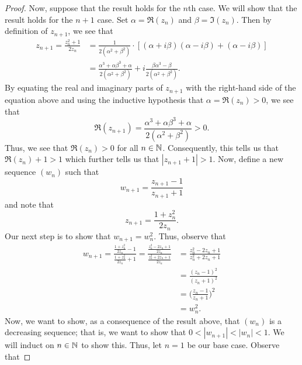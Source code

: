 \documentclass[a4paper]{article}
\begin{document}
\begin{enumerate}
\begin{proof}
        Now, suppose that the result holds for the \( n \)th case. We will show that the result holds for the \( n + 1  \) case. Set \( \alpha = \Re({z}_{n})  \) and \( \beta = \Im({z}_{n}) \). Then by definition of \( {z}_{n+1} \), we see that
        \begin{align*}
            {z}_{n+1} = \frac{ {z}_{n}^{2} + 1 }{ 2 {z}_{n} }                                                                 &= \frac{ 1 }{ 2(\alpha^{2} + \beta^{2})  }  \cdot [(\alpha + i \beta)(\alpha - i \beta) + (\alpha - i \beta)] \\
                                                                                                                              &= \frac{ \alpha^{3} + \alpha \beta^{3} + \alpha }{ 2(\alpha^{2} + \beta^{2}) } + i \frac{ \beta \alpha^{3} - \beta }{ 2(\alpha^{2} + \beta^{2}) }. 
        \end{align*}
        By equating the real and imaginary parts of \( {z}_{n+1} \) with the right-hand side of the equation above and using the inductive hypothesis that \(  \alpha = \Re({z}_{n})  > 0\), we see that
        \[  \Re({z}_{n+1}) = \frac{ \alpha^{3} + \alpha \beta^{3} + \alpha }{ 2 (\alpha^{2} + \beta^{2}) } > 0.  \]
Thus, we see that \( \Re({z}_{n}) > 0  \) for all \( n \in \mathbb{N} \). Consequently, this tells us that \( \Re({z}_{n}) + 1 >  1 \) which further tells us that \( | {z}_{n+1} + 1  | > 1  \). Now, define a new sequence \( ({w}_{n})  \) such that
\[  {w}_{n+1} = \frac{ {z}_{n+1} - 1  }{  {z}_{n+1} + 1  }   \]
        and note that 
        \[  {z}_{n+1} = \frac{ 1 + {z}_{n}^{2} }{  2 {z}_{n} }.  \]
        Our next step is to show that \( {w}_{n+1} = {w}_{n}^{2} \). Thus, observe that
        \begin{align*}
            {w}_{n+1} = \frac{ \frac{ 1 + {z}_{n}^{2} }{ 2 {z}_{n} }  - 1  }{ \frac{ 1 + {z}_{n}^{2} }{ 2 {z}_{n}} + 1   }  
                      = \frac{ \frac{ {z}_{n}^{2} - 2 {z}_{n} + 1}{2 {z}_{n}}  }{ \frac{ {z}_{n}^{2} + 2 {z}_{n} + 1  }{ 2 {z}_{n} }  }  
                      &= \frac{ {z}_{n}^{2} - 2 {z}_{n} + 1  }{  {z}_{n}^{2} + 2 {z}_{n} + 1  } \\
                      &= \frac{ ({z}_{n} - 1)^{2} }{ ({z}_{n} + 1)^{2} }  \\
                      &= \Big(  \frac{ {z}_{n} -1  }{ {z}_{n} + 1  }  \Big)^{2} \\
                      &= {w}_{n}^{2}.
        \end{align*}
        Now, we want to show, as a consequence of the result  above, that \( ({w}_{n}) \) is a decreasing sequence; that is, we want to show that  \( 0 < |  {w}_{n + 1}  |  < | {w}_{n} |  < 1 \). We will induct on \( n \in \mathbb{N}  \) to show this. Thus, let \( n = 1  \) be our base case. Observe that

\end{proof}
\end{enumerate}
\end{document}
